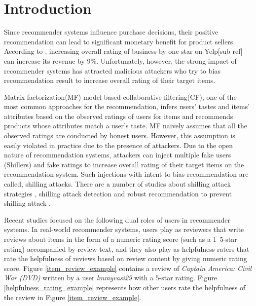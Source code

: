 \documentclass[master,english,final]{kaist-ucs}
\begin{document}
    \tableofcontents

    \listoftables

    \listoffigures



\chapter{Introduction}

Since recommender systems influence purchase decisions, their positive recommendation can lead to significant monetary benefit for product sellers.
According to \cite{yelp_study} , increasing overall rating of business by one star on Yelp[sub ref] can increase its revenue by 9\%.
Unfortunately, however, the strong impact of recommender systems has attracted malicious attackers who try to bias recommendation result to increase overall rating of their target items.

Matrix factorization(MF) model based collaborative filtering(CF), one of the most common approaches for the recommendation, infers users’ tastes and items’ attributes based on the observed ratings of users for items and recommends products whose attributes match a user’s taste.
MF naively assumes that all the observed ratings are conducted by honest users.
However, this assumption is easily violated in practice due to the presence of attackers.
Due to the open nature of recommendation systems, attackers can inject multiple fake users (Shillers) and fake ratings to increase overall rating of their target items on the recommendation system.
Such injections with intent to bias recommendation are called, shilling attacks.
There are a number of studies about shilling attack strategies , shilling attack detection  and robust recommendation to prevent shilling attack .

Recent studies \cite{DualRole,RQMF} focused on the following dual roles of users in recommender systems.
In real-world recommender systems, users play as reviewers that write reviews about items in the form of a numeric rating score (such as a 1~5-star rating) accompanied by review text, and they also play as helpfulness raters that rate the helpfulness of reviews based on review content by giving numeric rating score.
Figure \ref{item_review_example} contains a review of \textit{Captain America: Civil War (DVD)} written by a user \textit{lmmyvasi29} with a 5-star rating.
Figure \ref{helpfulness_rating_example} represents how other users rate the helpfulness of the review in Figure \ref{item_review_example}.
\end{document}
